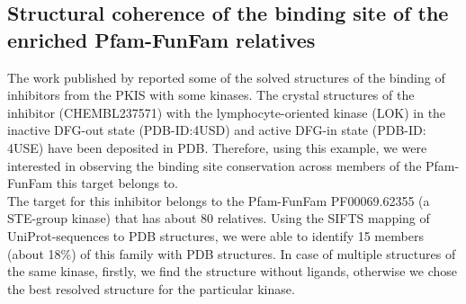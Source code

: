 \documentclass[a4paper, 11pt]{article}
\begin{document}
\subsection*{Structural coherence of the binding site of the enriched  Pfam-FunFam relatives}
The work published by \cite{elkins2016comprehensive} reported some of the solved structures of the binding of inhibitors from the PKIS with some kinases. The crystal structures of the inhibitor (CHEMBL237571) with the lymphocyte-oriented kinase (LOK) in the inactive DFG-out state (PDB-ID:4USD) and active DFG-in state (PDB-ID: 4USE) have been deposited in PDB. Therefore, using this example, we were interested in observing the binding site conservation across members of the Pfam-FunFam this target belongs to.\\
The target for this inhibitor belongs to the Pfam-FunFam PF00069.62355 (a STE-group kinase) that has about 80 relatives. Using the SIFTS mapping of UniProt-sequences to PDB structures, we were able to identify 15 members (about 18\%) of this family with PDB structures. In case of multiple structures of the same kinase, firstly, we find the structure without ligands, otherwise we chose the best resolved structure for the particular kinase.\\
\end{document}
